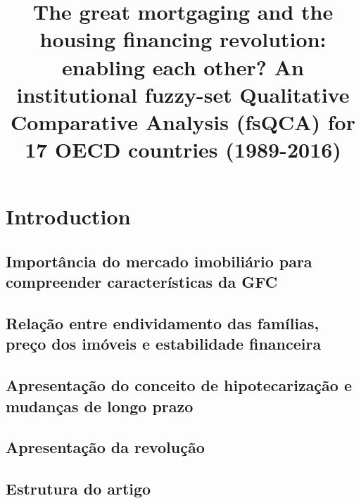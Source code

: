 \documentclass{SelfArx}
\date{}
\title{The great mortgaging and the housing financing revolution: enabling each other? An institutional fuzzy-set Qualitative Comparative Analysis (fsQCA) for 17 OECD countries (1989-2016)}
\begin{document}


\newcommand{\keywordname}{Keywords} %


\flushbottom %
\maketitle %
\thispagestyle{empty} %

\section*{Introduction}
\label{sec:org3c0d700}
\subsection*{Importância do mercado imobiliário para compreender características da GFC}
\label{sec:org9d17eab}
\subsection*{Relação entre endividamento das famílias, preço dos imóveis e estabilidade financeira}
\label{sec:orgeb00e3c}
\subsection*{Apresentação do conceito de hipotecarização e mudanças de longo prazo}
\label{sec:org18b2165}
\subsection*{Apresentação da revolução}
\label{sec:orga14d999}
\subsection*{Estrutura do artigo}
\label{sec:org2c74e1b}
\end{document}
